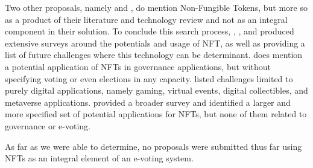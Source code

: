 \documentclass[../main.tex]{subfiles}
\begin{document}
    \par
    Two other proposals, namely \cite{Bistarelli2022} and \cite{Agbesi2019}, do mention Non-Fungible Tokens, but more so as a product of their literature and technology review and not as an integral component in their solution. To conclude this search process, \cite{Ali2023}, \cite{Bao2022}, and \cite{Wang2021} produced extensive surveys around the potentials and usage of NFT, as well as providing a list of future challenges where this technology can be determinant. \cite{Ali2023} does mention a potential application of NFTs in governance applications, but without specifying voting or even elections in any capacity. \cite{Wang2021} listed challenges limited to purely digital applications, namely gaming, virtual events, digital collectibles, and metaverse applications. \cite{Bao2022} provided a broader survey and identified a larger and more specified set of potential applications for NFTs, but none of them related to governance or e-voting.
    \par
    As far as we were able to determine, no proposals were submitted thus far using NFTs as an integral element of an e-voting system.
\end{document}
